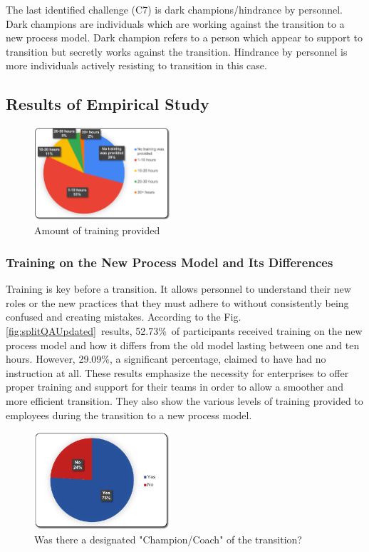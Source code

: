 \documentclass[conference]{IEEEtran}
\begin{document}
The last identified challenge (C7) is dark champions/hindrance by personnel. Dark champions are individuals which are working against the transition to a new process model. Dark champion refers to a person which appear to support to transition but secretly works against the transition. Hindrance by personnel is more individuals actively resisting to transition in this case. 

\subsection{Results of Empirical Study}

\begin{figure}[H]
    \centering
    \includegraphics[width=0.45\textwidth]{images/EmpC1-Training}
    \caption{Amount of training provided}
    \label{fig:EmpC1-Training}
\end{figure}
\subsubsection{Training on the New Process Model and Its Differences}
Training is key before a transition. It allows personnel to understand their new roles or the new practices that they must adhere to without consistently being confused and creating mistakes\cite{10.1145/1987875.1987901}. According to the Fig. \ref{fig:splitQAUpdated} results, 52.73\% of participants received training on the new process model and how it differs from the old model lasting between one and ten hours. However, 29.09\%, a significant percentage, claimed to have had no instruction at all. These results emphasize the necessity for enterprises to offer proper training and support for their teams in order to allow a smoother and more efficient transition. They also show the various levels of training provided to employees during the transition to a new process model.
\begin{figure}[H]
    \centering
    \includegraphics[width=0.45\textwidth]{images/EmpC2-Coach}
    \caption{Was there a designated "Champion/Coach" of the transition? }
    \label{fig:EmpC2-Coach}
\end{figure}
\end{document}
